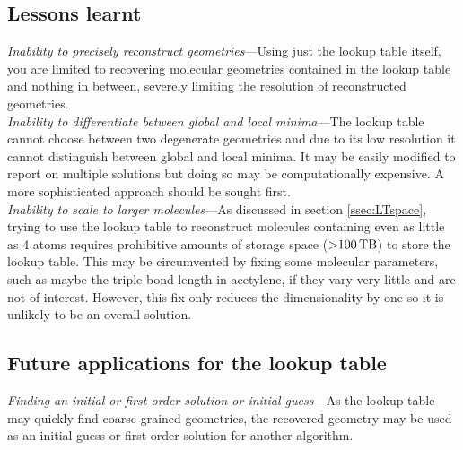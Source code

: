 \subsection{Lessons learnt}

\noindent
\emph{Inability to precisely reconstruct geometries}---Using just the lookup table itself, you are limited to recovering molecular geometries contained in the lookup table and nothing in between, severely limiting the resolution of reconstructed geometries. \\

\noindent
\emph{Inability to differentiate between global and local minima}---The lookup table cannot choose between two degenerate geometries and due to its low resolution it cannot distinguish between global and local minima. It may be easily modified to report on multiple solutions but doing so may be computationally expensive. A more sophisticated approach should be sought first. \\

\noindent
\emph{Inability to scale to larger molecules}---As discussed in section \ref{ssec:LTspace}, trying to use the lookup table to reconstruct molecules containing even as little as 4 atoms requires prohibitive amounts of storage space ($\SI{>100}{\tera\byte}$) to store the lookup table. This may be circumvented by fixing some molecular parameters, such as maybe the  triple bond length in acetylene, if they vary very little and are not of interest. However, this fix only reduces the dimensionality by one so it is unlikely to be an overall solution.

\subsection{Future applications for the lookup table}

\emph{Finding an initial or first-order solution or initial guess}---As the lookup table may quickly find coarse-grained geometries, the recovered geometry may be used as an initial guess or first-order solution for another algorithm. \\


